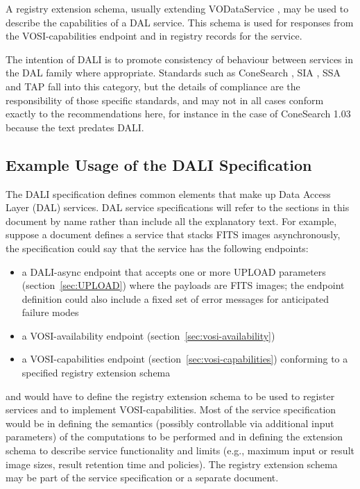 \documentclass[11pt,letter]{ivoa}
\begin{document}
A registry extension schema, usually extending VODataService \citep{2021ivoa.spec.1102D},
may be used to
describe the capabilities of a DAL service. This schema is used for
responses from the
VOSI-capabilities \citep{2017ivoa.spec.0524G} endpoint and in registry records for the
service.

The intention of DALI is to promote consistency of behaviour
between services in the DAL family where appropriate.
Standards such as
ConeSearch \citep{2008ivoa.specQ0222P},
SIA \citep{2015ivoa.spec.1223D},
SSA \citep{2012ivoa.spec.0210T} and
TAP \citep{2019ivoa.spec.0927D}
fall into this category,
but the details of compliance are the responsibility of those
specific standards, and may not in all cases conform exactly
to the recommendations here, for instance in the case of ConeSearch 1.03
because the text predates DALI.

\subsection{Example Usage of the DALI Specification}
The DALI specification defines common elements that make up Data Access Layer
(DAL) services. DAL service specifications will refer to the sections in this
document by name rather than include all the explanatory text. For example,
suppose a document defines a service that stacks FITS images asynchronously, the
specification could say that the service has the following endpoints:


\begin{itemize}
\item a DALI-async endpoint that accepts one or more UPLOAD parameters
(section~\ref{sec:UPLOAD}) where the payloads are FITS images; the
endpoint definition
could also include a fixed set of error messages for anticipated failure modes

\item a VOSI-availability endpoint (section~\ref{sec:vosi-availability})

\item a VOSI-capabilities endpoint (section~\ref{sec:vosi-capabilities}) conforming
to a specified registry extension schema
\end{itemize}

\noindent
and would have to define the registry extension schema to be used to register
services and to implement VOSI-capabilities. Most of the service
specification would be in defining the semantics (possibly controllable via
additional input parameters) of the computations to be performed and in defining
the extension schema to describe service functionality and limits (e.g., maximum
input or result image sizes, result retention time and policies). The registry
extension schema may be part of the service specification or a separate
document.
\end{document}
